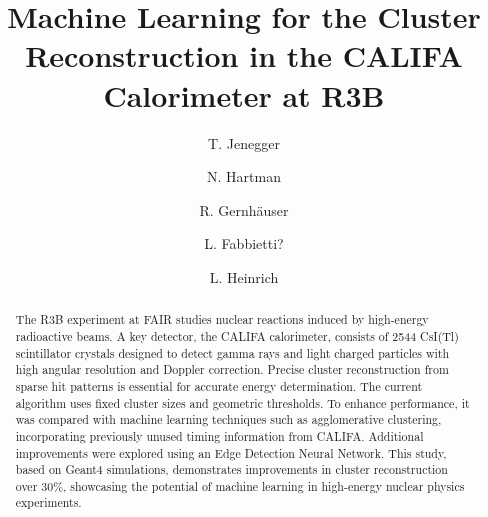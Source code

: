 \documentclass[final,5p,times,twocolumn]{elsarticle}
\begin{document}
\begin{frontmatter}



\title{Machine Learning for the Cluster Reconstruction in the CALIFA Calorimeter at R3B}

\author[1]{T. Jenegger}
\author[1]{N. Hartman}
\author[1]{R. Gernh\"auser}
\author[1]{L. Fabbietti?}
\author[1]{L. Heinrich}
\address[1]{{Technische Universit\"at M\"unchen},%
            {James-Franck-Str 1}, 
            {Garching b. München},
            {85748},
            {Germany}}

\begin{abstract}
The R3B experiment at FAIR studies nuclear reactions induced by high-energy radioactive beams. A key detector, the CALIFA calorimeter, consists of 2544 CsI(Tl) scintillator crystals designed to detect gamma rays and light charged particles with high angular resolution and Doppler correction.
Precise cluster reconstruction from sparse hit patterns is essential for accurate energy determination. The current algorithm uses fixed cluster sizes and geometric thresholds. To enhance performance, it was compared with machine learning techniques such as agglomerative clustering, incorporating previously unused timing information from CALIFA. Additional improvements were explored using an Edge Detection Neural Network.
This study, based on Geant4 simulations, demonstrates improvements in cluster reconstruction over 30\%, showcasing the potential of machine learning in high-energy nuclear physics experiments.
\end{abstract}


\end{frontmatter}
\end{document}
